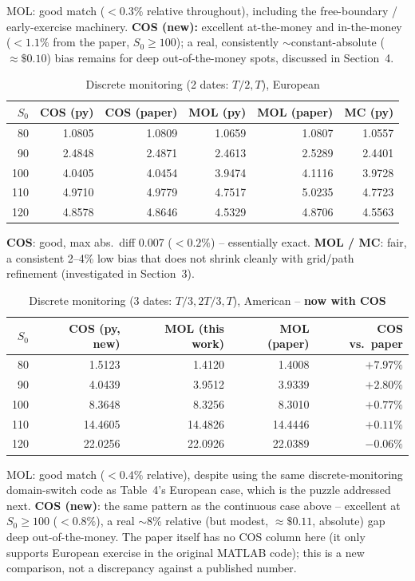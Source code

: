 \documentclass[11pt]{article}
\newcommand{\good}{\textcolor{green!45!black}{good}}
\newcommand{\fair}{\textcolor{orange!70!black}{fair}}
\begin{document}
MOL: \good{} match ($<0.3\%$ relative throughout), including the free-boundary /
early-exercise machinery. \textbf{COS (new):} excellent at-the-money and
in-the-money ($<1.1\%$ from the paper, $S_0 \ge 100$); a real, consistently
$\sim$constant-absolute ($\approx\$0.10$) bias remains for deep out-of-the-money
spots, discussed in Section~4.

\begin{table}[h]
\centering
\caption{Discrete monitoring (2 dates: $T/2, T$), European}
\begin{tabular}{@{}rrrrrr@{}}
\toprule
$S_0$ & COS (py) & COS (paper) & MOL (py) & MOL (paper) & MC (py) \\
\midrule
80  & 1.0805 & 1.0809 & 1.0659 & 1.0807 & 1.0557 \\
90  & 2.4848 & 2.4871 & 2.4613 & 2.5289 & 2.4401 \\
100 & 4.0405 & 4.0454 & 3.9474 & 4.1116 & 3.9728 \\
110 & 4.9710 & 4.9779 & 4.7517 & 5.0235 & 4.7723 \\
120 & 4.8578 & 4.8646 & 4.5329 & 4.8706 & 4.5563 \\
\bottomrule
\end{tabular}
\end{table}

\textbf{COS}: \good{}, max abs.\ diff 0.007 ($<0.2\%$) -- essentially exact.
\textbf{MOL / MC}: \fair{}, a consistent 2--4\% low bias that does not shrink
cleanly with grid/path refinement (investigated in Section~3).

\begin{table}[h]
\centering
\caption{Discrete monitoring (3 dates: $T/3, 2T/3, T$), American -- \textbf{now with COS}}
\begin{tabular}{@{}rrrrr@{}}
\toprule
$S_0$ & COS (py, new) & MOL (this work) & MOL (paper) & COS vs.\ paper \\
\midrule
80  & 1.5123 & 1.4120 & 1.4008 & $+7.97\%$ \\
90  & 4.0439 & 3.9512 & 3.9339 & $+2.80\%$ \\
100 & 8.3648 & 8.3256 & 8.3010 & $+0.77\%$ \\
110 & 14.4605 & 14.4826 & 14.4446 & $+0.11\%$ \\
120 & 22.0256 & 22.0926 & 22.0389 & $-0.06\%$ \\
\bottomrule
\end{tabular}
\end{table}

MOL: \good{} match ($<0.4\%$ relative), despite using the same
discrete-monitoring domain-switch code as Table~4's European case, which is
the puzzle addressed next. \textbf{COS (new)}: the same pattern as the
continuous case above -- excellent at $S_0 \ge 100$ ($<0.8\%$), a real
$\sim$8\% relative (but modest, $\approx\$0.11$, absolute) gap deep
out-of-the-money. The paper itself has no COS column here (it only supports
European exercise in the original MATLAB code); this is a new comparison, not
a discrepancy against a published number.
\end{document}
